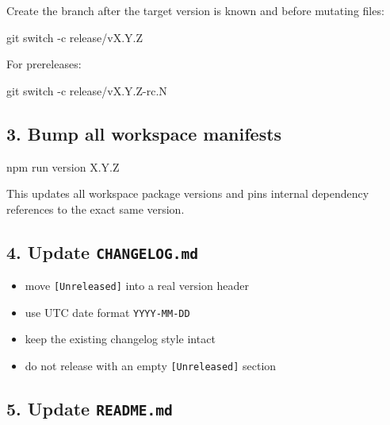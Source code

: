 Create the branch after the target version is known and before mutating files:

\begin{CodeBlock}
git switch -c release/vX.Y.Z
\end{CodeBlock}

For prereleases:

\begin{CodeBlock}
git switch -c release/vX.Y.Z-rc.N
\end{CodeBlock}

\subsection{3. Bump all workspace manifests}\label{record-274-bump-all-workspace-manifests}

\begin{CodeBlock}
npm run version X.Y.Z
\end{CodeBlock}

This updates all workspace package versions and pins internal dependency references to the exact same version.

\subsection{\texorpdfstring{4. Update \texttt{C\allowbreak{}H\allowbreak{}A\allowbreak{}N\allowbreak{}G\allowbreak{}E\allowbreak{}L\allowbreak{}O\allowbreak{}G\allowbreak{}.\allowbreak{}m\allowbreak{}d}}{4. Update }}\label{record-274-update-changelog.md}

\begin{itemize}
\tightlist
\item
  move \texttt{[\allowbreak{}U\allowbreak{}n\allowbreak{}r\allowbreak{}e\allowbreak{}l\allowbreak{}e\allowbreak{}a\allowbreak{}s\allowbreak{}e\allowbreak{}d\allowbreak{}]} into a real version header
\item
  use UTC date format \texttt{Y\allowbreak{}Y\allowbreak{}Y\allowbreak{}Y\allowbreak{}-\allowbreak{}M\allowbreak{}M\allowbreak{}-\allowbreak{}D\allowbreak{}D}
\item
  keep the existing changelog style intact
\item
  do not release with an empty \texttt{[\allowbreak{}U\allowbreak{}n\allowbreak{}r\allowbreak{}e\allowbreak{}l\allowbreak{}e\allowbreak{}a\allowbreak{}s\allowbreak{}e\allowbreak{}d\allowbreak{}]} section
\end{itemize}

\subsection{\texorpdfstring{5. Update \texttt{R\allowbreak{}E\allowbreak{}A\allowbreak{}D\allowbreak{}M\allowbreak{}E\allowbreak{}.\allowbreak{}m\allowbreak{}d}}{5. Update }}\label{record-274-update-readme.md}

